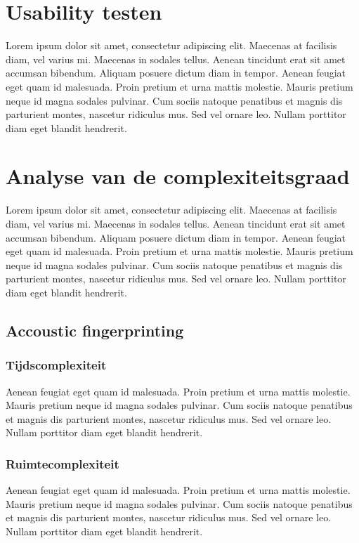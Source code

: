 \section{Usability testen}

Lorem ipsum dolor sit amet, consectetur adipiscing elit. Maecenas at facilisis diam, vel varius mi. Maecenas in sodales tellus. Aenean tincidunt erat sit amet accumsan bibendum. Aliquam posuere dictum diam in tempor. Aenean feugiat eget quam id malesuada. Proin pretium et urna mattis molestie. Mauris pretium neque id magna sodales pulvinar. Cum sociis natoque penatibus et magnis dis parturient montes, nascetur ridiculus mus. Sed vel ornare leo. Nullam porttitor diam eget blandit hendrerit.


\section{Analyse van de complexiteitsgraad}

Lorem ipsum dolor sit amet, consectetur adipiscing elit. Maecenas at facilisis diam, vel varius mi. Maecenas in sodales tellus. Aenean tincidunt erat sit amet accumsan bibendum. Aliquam posuere dictum diam in tempor. Aenean feugiat eget quam id malesuada. Proin pretium et urna mattis molestie. Mauris pretium neque id magna sodales pulvinar. Cum sociis natoque penatibus et magnis dis parturient montes, nascetur ridiculus mus. Sed vel ornare leo. Nullam porttitor diam eget blandit hendrerit.


\subsection{Accoustic fingerprinting}

\subsubsection{Tijdscomplexiteit}

Aenean feugiat eget quam id malesuada. Proin pretium et urna mattis molestie. Mauris pretium neque id magna sodales pulvinar. Cum sociis natoque penatibus et magnis dis parturient montes, nascetur ridiculus mus. Sed vel ornare leo. Nullam porttitor diam eget blandit hendrerit.

\subsubsection{Ruimtecomplexiteit}

Aenean feugiat eget quam id malesuada. Proin pretium et urna mattis molestie. Mauris pretium neque id magna sodales pulvinar. Cum sociis natoque penatibus et magnis dis parturient montes, nascetur ridiculus mus. Sed vel ornare leo. Nullam porttitor diam eget blandit hendrerit.

